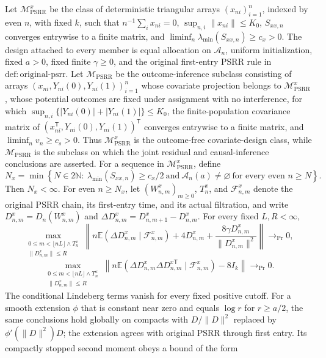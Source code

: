 Let \(\mathcal M_{\mathrm{PSRR}}^{x}\) be the class of deterministic triangular arrays \((x_{ni})_{i=1}^n\), indexed by even \(n\), with fixed \(k\), such that \(n^{-1}\sum_i x_{ni}=0\), \(\sup_{n,i}\|x_{ni}\|\le K_0\), \(S_{xx,n}\) converges entrywise to a finite matrix, and \(\liminf_n\lambda_{\min}(S_{xx,n})\ge c_x>0\).  The design attached to every member is equal allocation on \(\mathcal A_n\), uniform initialization, fixed \(a>0\), fixed finite \(\gamma\ge0\), and the original first-entry PSRR rule in \(\mathrm{def{:}original\mbox{-}psrr}\).  Let \(\mathcal M_{\mathrm{PSRR}}\) be the outcome-inference subclass consisting of arrays \((x_{ni},Y_{ni}(0),Y_{ni}(1))_{i=1}^n\) whose covariate projection belongs to \(\mathcal M_{\mathrm{PSRR}}^{x}\), whose potential outcomes are fixed under assignment with no interference, for which \(\sup_{n,i}\{|Y_{ni}(0)|+|Y_{ni}(1)|\}\le K_0\), the finite-population covariance matrix of \((x_{ni}^{\mathsf T},Y_{ni}(0),Y_{ni}(1))^{\mathsf T}\) converges entrywise to a finite matrix, and \(\liminf_n v_n\ge c_s>0\).  Thus \(\mathcal M_{\mathrm{PSRR}}^{x}\) is the outcome-free covariate-design class, while \(\mathcal M_{\mathrm{PSRR}}\) is the subclass on which the joint residual and causal-inference conclusions are asserted.
For a sequence in \(\mathcal M_{\mathrm{PSRR}}^{x}\), define
\[
 N_x=\min\left\{N\in2\mathbb N:\ \lambda_{\min}(S_{xx,n})\ge c_x/2\ \text{and}\ \mathcal A_n(a)\ne\varnothing\ \text{for every even }n\ge N\right\}.
\]
Then \(N_x<\infty\).  For even \(n\ge N_x\), let \((W^x_{n,m})_{m\ge0}\), \(T_n^x\), and \(\mathcal F^x_{n,m}\) denote the original PSRR chain, its first-entry time, and its actual filtration, and write \(D^x_{n,m}=D_n(W^x_{n,m})\) and \(\Delta D^x_{n,m}=D^x_{n,m+1}-D^x_{n,m}\).  For every fixed \(L,R<\infty\),
\[
 \max_{\substack{0\le m<\lfloor nL\rfloor\wedge T_n^x\\ \|D^x_{n,m}\|\le R}}
 \left\|n\mathbb E(\Delta D^x_{n,m}\mid\mathcal F^x_{n,m})+4D^x_{n,m}
 +\frac{8\gamma D^x_{n,m}}{\|D^x_{n,m}\|^2}\right\|\longrightarrow_{\Pr}0,
\]
\[
 \max_{\substack{0\le m<\lfloor nL\rfloor\wedge T_n^x\\ \|D^x_{n,m}\|\le R}}
 \left\|n\mathbb E(\Delta D^x_{n,m}\Delta D^{x\mathsf T}_{n,m}\mid\mathcal F^x_{n,m})-8I_k\right\|\longrightarrow_{\Pr}0.
\]
The conditional Lindeberg terms vanish for every fixed positive cutoff.  For a smooth extension \(\phi\) that is constant near zero and equals \(\log r\) for \(r\ge a/2\), the same conclusions hold globally on compacts with \(D/\|D\|^2\) replaced by \(\phi'(\|D\|^2)D\); the extension agrees with original PSRR through first entry.  Its compactly stopped second moment obeys a bound of the form
